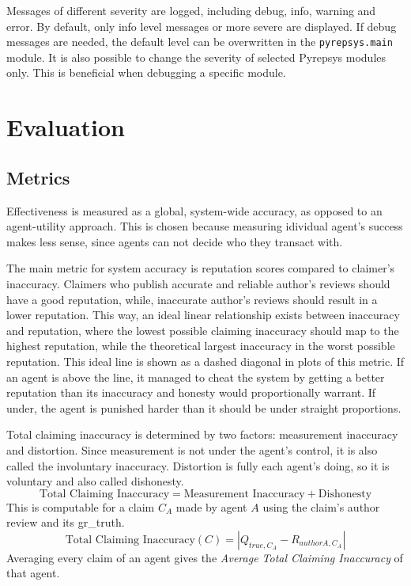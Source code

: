\documentclass[%
    ]{\PathToTumTemplate/thesis/tum_thesis}
\begin{document}
Messages of different severity are logged, including debug, info, warning and error.
By default, only info level messages or more severe are displayed.
If debug messages are needed, the default level can be overwritten in the \texttt{pyrepsys.main} module.
It is also possible to change the severity of selected Pyrepsys modules only.
This is beneficial when debugging a specific module.




\chapter{Evaluation} \label{chap:evaluation}


\section{Metrics}\label{sec:metrics}

Effectiveness is measured as a global, system-wide accuracy, as opposed to an agent-utility approach.
This is chosen because measuring idividual agent's success makes less sense, since agents can not decide who they transact with.

The main metric for system accuracy is reputation scores compared to claimer's inaccuracy.
Claimers who publish accurate and reliable author's reviews should have a good reputation, while, inaccurate author's reviews should result in a lower reputation.
This way, an ideal linear relationship exists between inaccuracy and reputation, where the lowest possible claiming inaccuracy should map to the highest reputation, while the theoretical largest inaccuracy in the worst possible reputation.
This ideal line is shown as a dashed diagonal in plots of this metric.
If an agent is above the line, it managed to cheat the system by getting a better reputation than its inaccuracy and honesty would proportionally warrant.
If under, the agent is punished harder than it should be under straight proportions.

Total claiming inaccuracy is determined by two factors: measurement inaccuracy and distortion.
Since measurement is not under the agent's control, it is also called the involuntary inaccuracy.
Distortion is fully each agent's doing, so it is voluntary and also called dishonesty.
\begin{equation}
\text{Total Claiming Inaccuracy} = \text{Measurement Inaccuracy} + \text{Dishonesty}
\end{equation}
This is computable for a claim $C_A$ made by agent $A$ using the claim's author review and its \gls{gr_truth}.
\begin{equation}
\text{Total Claiming Inaccuracy}(C) = \left| Q_{true,C_{A}} - R_{authorA,C_{A}} \right|
\end{equation}
Averaging every claim of an agent gives the \emph{Average Total Claiming Inaccuracy} of that agent.
\end{document}
